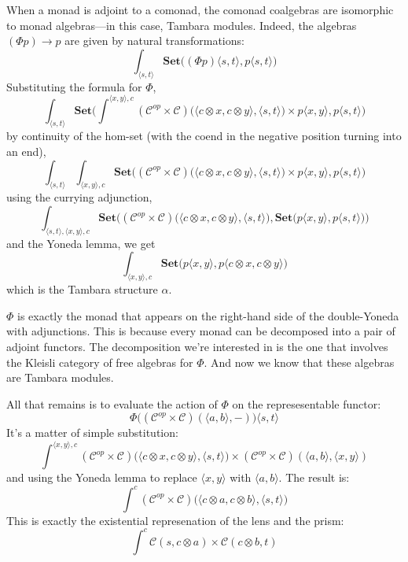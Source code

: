 \documentclass[11pt]{amsart}
\begin{document}
When a monad is adjoint to a comonad, the comonad coalgebras are isomorphic to monad algebras---in this case, Tambara modules. Indeed, the algebras $(\Phi p) \to p$ are given by natural transformations:
\[ \int_{\langle s, t \rangle} \mathbf{Set}\Big( (\Phi p) \langle s, t \rangle, p\langle s, t \rangle \Big) \]
Substituting the formula for $\Phi$,
\[ \int_{\langle s, t \rangle} \mathbf{Set}\Big( \int^{\langle x, y \rangle, c} (\mathcal{C}^{op} \times \mathcal{C})\big(\langle c \otimes x, c \otimes y \rangle, \langle s, t \rangle \big) \times p \langle x, y \rangle, p\langle s, t \rangle \Big)\]
by continuity of the hom-set (with the coend in the negative position turning into an end),
\[ \int_{\langle s, t \rangle} \int_{\langle x, y \rangle, c}\mathbf{Set}\Big(  (\mathcal{C}^{op} \times \mathcal{C})\big(\langle c \otimes x, c \otimes y \rangle, \langle s, t \rangle \big) \times p \langle x, y \rangle, p\langle s, t \rangle \Big)\]
using the currying adjunction,
\[ \int_{\langle s, t \rangle, \langle x, y \rangle, c}\mathbf{Set}\Big(  (\mathcal{C}^{op} \times \mathcal{C})\big(\langle c \otimes x, c \otimes y \rangle, \langle s, t \rangle \big),   \mathbf{Set}\big( p \langle x, y \rangle, p\langle s, t \rangle \big) \Big)\]
and the Yoneda lemma, we get
\[ \int_{\langle x, y \rangle, c}    \mathbf{Set}\big( p \langle x, y \rangle, p\langle c \otimes x, c \otimes y \rangle \big) \]
which is the Tambara structure $\alpha$.

$\Phi$ is exactly the monad that appears on the right-hand side of the double-Yoneda with adjunctions. This is because every monad can be decomposed into a pair of adjoint functors. The decomposition we're interested in is the one that involves the Kleisli category of free algebras for $\Phi$. And now we know that these algebras are Tambara modules.

All that remains is to evaluate the action of $\Phi$ on the represesentable functor:
\[ \Phi \big( (\mathcal{C}^{op} \times \mathcal{C})(\langle a, b \rangle, -) \big) \langle s, t \rangle\]
It's a matter of simple substitution:
\[  \int^{\langle x, y \rangle, c} (\mathcal{C}^{op} \times \mathcal{C})\big(\langle c \otimes x, c \otimes y \rangle, \langle s, t \rangle \big) \times (\mathcal{C}^{op} \times \mathcal{C})(\langle a, b \rangle,  \langle x, y \rangle)\]
and using the Yoneda lemma to replace $ \langle x, y \rangle$ with $ \langle a, b \rangle$. The result is:
\[ \int^c (\mathcal{C}^{op} \times \mathcal{C})\big(\langle c \otimes a, c \otimes b \rangle, \langle s, t \rangle \big)  \]
This is exactly the existential represenation of the lens and the prism:
\[ \int^c \mathcal{C}(s, c \otimes a) \times \mathcal{C}(c \otimes b, t) \]
\end{document}
